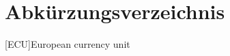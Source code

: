 \documentclass{article}
\begin{document}
\section*{Abkürzungsverzeichnis}

\begin{acronym}[ECU]
[ECU]{European currency unit}

\end{acronym}
\end{document}
